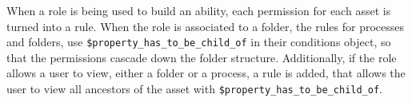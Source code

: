 When a role is being used to build an ability, each permission for each asset is turned into a
rule.
When the role is associated to a folder, the rules for processes and folders, use
\lstinline{$property_has_to_be_child_of} in their conditions object, so that the
permissions cascade down the folder structure.
Additionally, if the role allows a user to view, either a folder or a process, a rule is
added, that allows the user to view all ancestors of the asset with
\lstinline{$property_has_to_be_child_of}.

